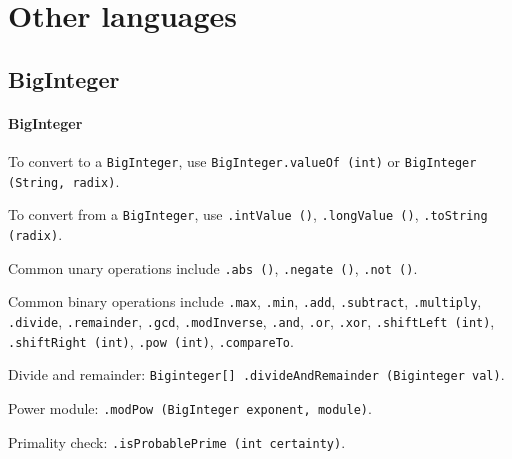 \section{Other languages}
	\subsection{BigInteger}
	\paragraph{BigInteger}
To convert to a \texttt{BigInteger}, use \texttt{BigInteger.valueOf (int)} or \texttt{BigInteger (String, radix)}.

To convert from a \texttt{BigInteger}, use \texttt{.intValue ()}, \texttt{.longValue ()}, \texttt{.toString (radix)}.

Common unary operations include \texttt{.abs ()}, \texttt{.negate ()}, \texttt{.not ()}.

Common binary operations include \texttt{.max}, \texttt{.min}, \texttt{.add}, \texttt{.subtract}, \texttt{.multiply}, \texttt{.divide}, \texttt{.remainder}, \texttt{.gcd}, \texttt{.modInverse}, \texttt{.and}, \texttt{.or}, \texttt{.xor}, \texttt{.shiftLeft (int)}, \texttt{.shiftRight (int)}, \texttt{.pow (int)}, \texttt{.compareTo}.

Divide and remainder: \texttt{Biginteger[] .divideAndRemainder (Biginteger val)}.

Power module: \texttt{.modPow (BigInteger exponent, module)}.

Primality check: \texttt{.isProbablePrime (int certainty)}.\newline

